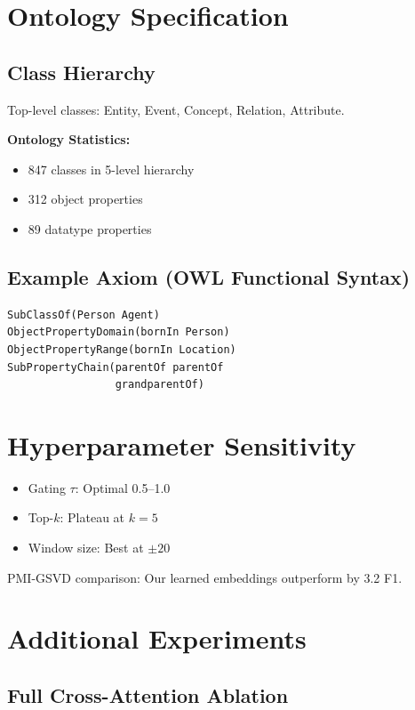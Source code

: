 \documentclass[10pt,twocolumn]{article}
\begin{document}
\section{Ontology Specification}
\label{app:ontology}

\subsection{Class Hierarchy}
Top-level classes: Entity, Event, Concept, Relation, Attribute.

\textbf{Ontology Statistics:}
\begin{itemize}
    \item 847 classes in 5-level hierarchy
    \item 312 object properties
    \item 89 datatype properties
\end{itemize}

\subsection{Example Axiom (OWL Functional Syntax)}
\begin{verbatim}
SubClassOf(Person Agent)
ObjectPropertyDomain(bornIn Person)
ObjectPropertyRange(bornIn Location)
SubPropertyChain(parentOf parentOf 
                 grandparentOf)
\end{verbatim}

\section{Hyperparameter Sensitivity}
\label{app:hyper}

\begin{itemize}
    \item Gating $\tau$: Optimal 0.5--1.0
    \item Top-$k$: Plateau at $k=5$
    \item Window size: Best at $\pm20$
\end{itemize}

PMI-GSVD comparison: Our learned embeddings outperform by 3.2 F1.

\section{Additional Experiments}
\label{app:extra}


\subsection{Full Cross-Attention Ablation}
\end{document}
